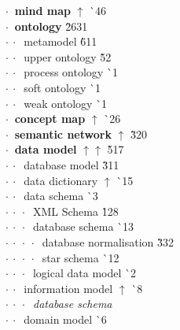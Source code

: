 \begin{tabbing}
$\cdot\:$  \textbf{mind map} $\uparrow$ \` {\raisebox{.4\height}{\scalebox{.6}{+}}}46\\
$\cdot\:$  \textbf{ontology}  \` 26{\raisebox{.4\height}{\scalebox{.6}{+}}}31\\
$\cdot\:\cdot\:$  metamodel  \` 6{\raisebox{.4\height}{\scalebox{.6}{+}}}11\\
$\cdot\:\cdot\:$  upper ontology  \` 5{\raisebox{.4\height}{\scalebox{.6}{+}}}2\\
$\cdot\:\cdot\:$  process ontology  \` {\raisebox{.4\height}{\scalebox{.6}{+}}}1\\
$\cdot\:\cdot\:$  soft ontology  \` {\raisebox{.4\height}{\scalebox{.6}{+}}}1\\
$\cdot\:\cdot\:$  weak ontology  \` {\raisebox{.4\height}{\scalebox{.6}{+}}}1\\
$\cdot\:$  \textbf{concept map} $\uparrow$ \` {\raisebox{.4\height}{\scalebox{.6}{+}}}26\\
$\cdot\:$  \textbf{semantic network} $\uparrow$ \` 3{\raisebox{.4\height}{\scalebox{.6}{+}}}20\\
$\cdot\:$  \textbf{data model} $\uparrow\uparrow$ \` 5{\raisebox{.4\height}{\scalebox{.6}{+}}}17\\
$\cdot\:\cdot\:$  database model  \` 3{\raisebox{.4\height}{\scalebox{.6}{+}}}11\\
$\cdot\:\cdot\:$  data dictionary $\uparrow$ \` {\raisebox{.4\height}{\scalebox{.6}{+}}}15\\
$\cdot\:\cdot\:$  data schema  \` {\raisebox{.4\height}{\scalebox{.6}{+}}}3\\
$\cdot\:\cdot\:\cdot\:$  XML Schema  \` 1{\raisebox{.4\height}{\scalebox{.6}{+}}}28\\
$\cdot\:\cdot\:\cdot\:$  database schema  \` {\raisebox{.4\height}{\scalebox{.6}{+}}}13\\
$\cdot\:\cdot\:\cdot\:\cdot\:$  database normalisation  \` 3{\raisebox{.4\height}{\scalebox{.6}{+}}}32\\
$\cdot\:\cdot\:\cdot\:\cdot\:$  star schema  \` {\raisebox{.4\height}{\scalebox{.6}{+}}}12\\
$\cdot\:\cdot\:\cdot\:$  logical data model  \` {\raisebox{.4\height}{\scalebox{.6}{+}}}2\\
$\cdot\:\cdot\:$  information model $\uparrow$ \` {\raisebox{.4\height}{\scalebox{.6}{+}}}8\\
$\cdot\:\cdot\:\cdot\:$  \textit{database schema}\\
$\cdot\:\cdot\:$  domain model  \` {\raisebox{.4\height}{\scalebox{.6}{+}}}6\\

\end{tabbing}
